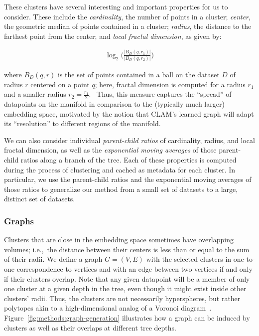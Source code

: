 These clusters have several interesting and important properties for us to consider.
These include the \textit{cardinality}, the number of points in a cluster;
\textit{center}, the geometric median of points contained in a cluster;
\textit{radius}, the distance to the farthest point from the center;
and \textit{local fractal dimension},
as given by:

\begin{gather}
    \log_2\bigg(\frac{|B_D(q, r_1)|}{|B_D(q, r_2)|}\bigg)
    \label{fractal-dimension}
\end{gather}

where $B_D(q,r)$ is the set of points contained in a ball on the dataset $D$ of radius $r$ centered on a point $q$; here, fractal dimension is computed for a radius $r_1$ and a smaller radius $r_2=\frac{r_1}{2}$.~\cite{ishaq2019clustered}
Thus, this measure captures the ``spread'' of datapoints on the manifold in comparison to the (typically much larger) embedding space, motivated by the notion that CLAM's learned graph will adapt its ``resolution'' to different regions of the manifold.


We can also consider individual \textit{parent-child ratios} of cardinality, radius, and local fractal dimension, as well as the \textit{exponential moving averages} of those parent-child ratios along a branch of the tree.
Each of these properties is computed during the process of clustering and cached as metadata for each cluster.
In particular, we use the parent-child ratios and the exponential moving averages of those ratios to generalize our method from a small set of datasets to a large, distinct set of datasets.

\subsubsection{Graphs}
Clusters that are close in the embedding space sometimes have overlapping volumes; i.e.,\ the distance between their centers is less than or equal to the sum of their radii.
We define a graph $G=(V,E)$ with the selected clusters in one-to-one correspondence to vertices and with an edge between two vertices if and only if their clusters overlap.
Note that any given datapoint will be a member of only one cluster at a given depth in the tree, even though it might exist inside other clusters' radii.
Thus, the clusters are not necessarily hyperspheres, but rather polytopes akin to a high-dimensional analog of a Voronoi diagram~\cite{voronoi1908nouvelles}.
Figure~\ref{fig:methods:graph-generation} illustrates how a graph can be induced by clusters as well as their overlaps at different tree depths.

